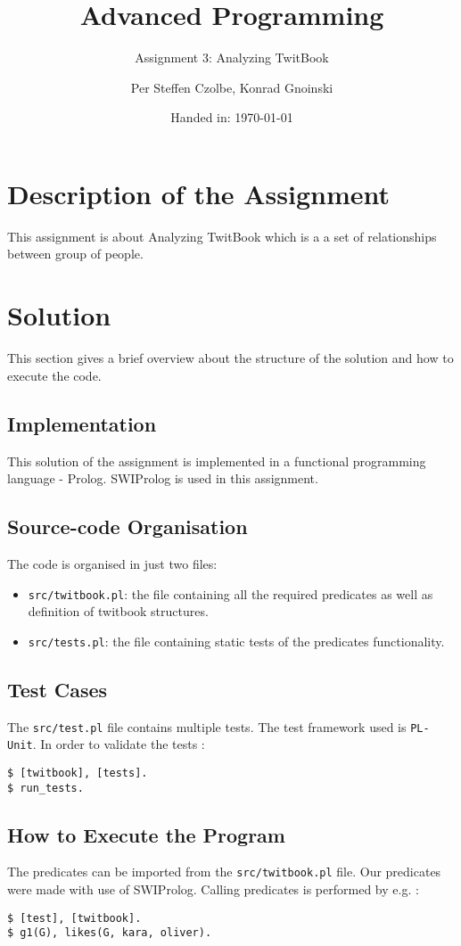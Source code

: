 \documentclass[11pt, a4paper]{article}
\author{Per Steffen Czolbe, Konrad Gnoinski}
\title{Advanced Programming}
\subtitle{Assignment 3: Analyzing TwitBook} %
\date{Handed in: \today}
\begin{document}
\maketitle

\tableofcontents


\section{Description of the Assignment}

This assignment is about Analyzing TwitBook which is a a set of relationships between group of people. 

\section{Solution}
This section gives a brief overview about the structure of the solution and how to execute the code.

\subsection{Implementation}
This solution of the assignment is implemented in a functional programming language - Prolog. SWIProlog is used in this assignment. 

\subsection{Source-code Organisation}
The code is organised in just two files:
\begin{itemize}
	\item \texttt{src/twitbook.pl}: the file containing all the required predicates as well as definition of twitbook structures. 
	\item \texttt{src/tests.pl}: the file containing static tests of the predicates functionality.
\end{itemize}

\subsection{Test Cases}
The \texttt{src/test.pl} file contains multiple tests. The test framework used is \texttt{PL-Unit}. In order to validate the tests :
\begin{lstlisting}[style=Bash]
$ [twitbook], [tests].
$ run_tests.
\end{lstlisting}

\subsection{How to Execute the Program}
The predicates can be imported from the \texttt{src/twitbook.pl} file. Our predicates were made with use of SWIProlog. Calling predicates is performed by e.g. :
\begin{lstlisting}[style=Bash]
$ [test], [twitbook].
$ g1(G), likes(G, kara, oliver).
\end{lstlisting}
\end{document}
